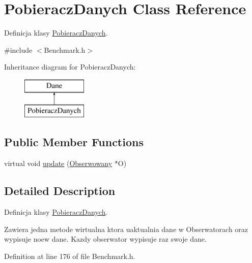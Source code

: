 \hypertarget{class_pobieracz_danych}{\section{Pobieracz\-Danych Class Reference}
\label{class_pobieracz_danych}
}


Definicja klasy \hyperlink{class_pobieracz_danych}{Pobieracz\-Danych}.  




{\ttfamily \#include $<$Benchmark.\-h$>$}

Inheritance diagram for Pobieracz\-Danych\-:\begin{figure}[H]
\begin{center}
\leavevmode
\includegraphics[height=2.000000cm]{class_pobieracz_danych}
\end{center}
\end{figure}
\subsection*{Public Member Functions}
\begin{DoxyCompactItemize}
\item 
virtual void \hyperlink{class_pobieracz_danych_a36a1901f8c7f9228f90c713a8e267b98}{update} (\hyperlink{class_obserwowany}{Obserwowany} $\ast$O)
\end{DoxyCompactItemize}


\subsection{Detailed Description}
Definicja klasy \hyperlink{class_pobieracz_danych}{Pobieracz\-Danych}. 

Zawiera jedna metode wirtualna ktora uaktualnia dane w Obserwatorach oraz wypisuje noew dane. Kazdy obserwator wypisuje raz swoje dane. 

Definition at line 176 of file Benchmark.\-h.



